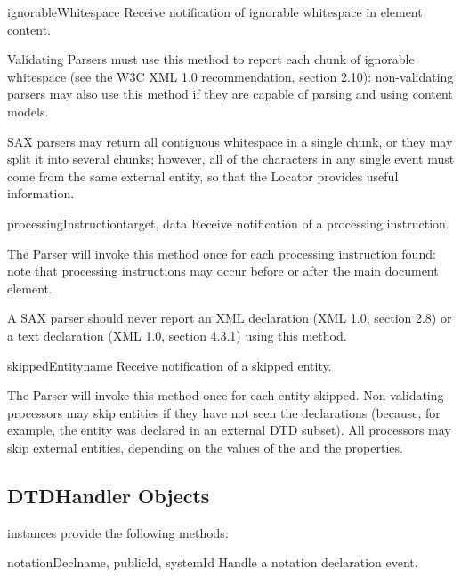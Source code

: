 \begin{methoddesc}[ContentHandler]{ignorableWhitespace}{}
  Receive notification of ignorable whitespace in element content.
        
  Validating Parsers must use this method to report each chunk
  of ignorable whitespace (see the W3C XML 1.0 recommendation,
  section 2.10): non-validating parsers may also use this method
  if they are capable of parsing and using content models.
  
  SAX parsers may return all contiguous whitespace in a single
  chunk, or they may split it into several chunks; however, all
  of the characters in any single event must come from the same
  external entity, so that the Locator provides useful
  information.
\end{methoddesc}

\begin{methoddesc}[ContentHandler]{processingInstruction}{target, data}
  Receive notification of a processing instruction.
        
  The Parser will invoke this method once for each processing
  instruction found: note that processing instructions may occur
  before or after the main document element.

  A SAX parser should never report an XML declaration (XML 1.0,
  section 2.8) or a text declaration (XML 1.0, section 4.3.1) using
  this method.
\end{methoddesc}

\begin{methoddesc}[ContentHandler]{skippedEntity}{name}
  Receive notification of a skipped entity.
        
  The Parser will invoke this method once for each entity
  skipped. Non-validating processors may skip entities if they have
  not seen the declarations (because, for example, the entity was
  declared in an external DTD subset). All processors may skip
  external entities, depending on the values of the
   and the
   properties.
\end{methoddesc}


\subsection{DTDHandler Objects \label{dtd-handler-objects}}

 instances provide the following methods:

\begin{methoddesc}[DTDHandler]{notationDecl}{name, publicId, systemId}
  Handle a notation declaration event.
\end{methoddesc}

